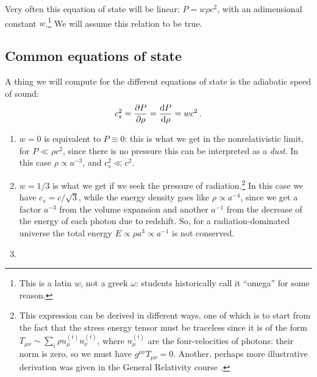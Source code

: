 \documentclass[main.tex]{subfiles}
\begin{document}
Very often this equation of state will be linear: \(P = w \rho c^2\), with an adimensional constant \(w\).\footnote{This is a latin \(w\), not a greek \(\omega \): students historically call it ``omega'' for some reason.}
We will assume this relation to be true.



\subsection{Common equations of state}

A thing we will compute for the different equations of state is the adiabatic speed of sound: 
%
\begin{align}
c^2_{s} = \pdv{P}{\rho } = \dv{P}{\rho } = w c^2
\,.
\end{align}


\begin{enumerate}
  \item \(w = 0\) is equivalent to \(P \equiv 0\): this is what we get in the nonrelativistic limit, for \(P \ll \rho c^2\), since there is no pressure this can be interpreted as a \emph{dust}. In this case \(\rho \propto a^{-3}\), and \(c_s^2 \ll c^2\). 
  \item \(w = 1/3\) is what we get if we seek the pressure of radiation.\footnote{This expression can be derived in different ways, one of which is to start from the fact that the stress energy tensor must be traceless since it is of the form \(T_{\mu \nu } \sim \sum _{i} \rho u^{(i)}_{\mu } u^{(i)}_{\nu }\), where \(u_{\mu }^{(i)}\) are the four-velocities of photons: their norm is zero, so we must have \(g^{\mu \nu} T_{\mu \nu } = 0\). Another, perhaps more illustrative derivation was given in the General Relativity course \cite[pag. 86-87]{tissinoGeneralRelativityNotes2020}.}
  In this case we have \(c_s = c/ \sqrt{3}\), while the energy density goes like \(\rho \propto a^{-4}\), since we get a factor \(a^{-3}\) from the volume expansion and another \(a^{-1}\) from the decrease of the energy of each photon due to redshift. So, for a radiation-dominated universe the total energy \(E \propto \rho a^{3} \propto a^{-1}\) is not conserved. 
  \item 
\end{enumerate}


\end{document}
